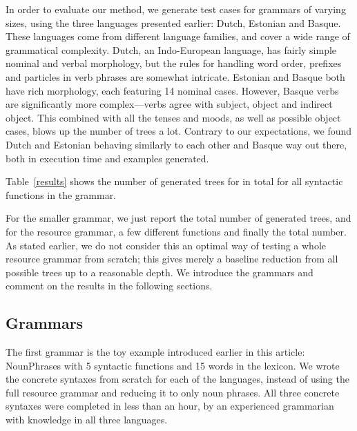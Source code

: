 \documentclass[11pt]{article}
\begin{document}
In order to evaluate our method, we generate test cases for grammars
of varying sizes, using the three languages presented earlier: Dutch,
Estonian and Basque. These languages come from different language
families, and cover a wide range of grammatical complexity. Dutch, an
Indo-European language, has fairly simple nominal and verbal
morphology, but the rules for handling word order, prefixes and
particles in verb phrases are somewhat intricate. Estonian and Basque
both have rich morphology, each featuring 14 nominal cases. However, Basque
verbs are significantly more complex---verbs agree with subject, object
and indirect object. This combined with all the tenses and moods, as
well as possible object cases, blows up the number of trees a
lot. Contrary to our expectations, we found Dutch and Estonian
behaving similarly to each other and Basque way out there, both in
execution time and examples generated.

Table~\ref{results} shows the number of generated trees for 
in total for all syntactic functions in
the grammar. 

For the smaller grammar, we just report the total number of generated
trees, and for the resource grammar, a few different functions and
finally the total number. As stated earlier, we do not consider this
an optimal way of testing a whole resource grammar from scratch;
this gives merely a baseline reduction from all possible trees up to a
reasonable depth. We introduce the grammars and comment on the results
in the following sections. 

\subsection{Grammars}

The first grammar is the toy example introduced earlier in this
article: NounPhrases with 5 syntactic functions and 15 words in the
lexicon. We wrote the concrete syntaxes from scratch for each of the
languages, instead of using the full resource grammar and reducing it
to only noun phrases. All three concrete syntaxes were completed
in less than an hour, by an experienced grammarian with knowledge in
all three languages.
\end{document}
